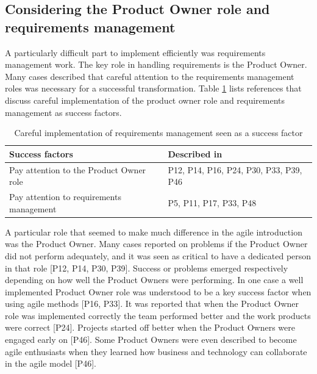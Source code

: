 \subsection{Considering the Product Owner role and requirements management}

A particularly difficult part to implement efficiently was requirements
management work. The key role in handling requirements is the Product Owner.
Many cases described that careful attention to the requirements management roles
was necessary for a successful transformation.
Table \ref{table:success_requirements} lists references that discuss careful
implementation of the product owner role and requirements management as success
factors.

\begin{table}[h]
    \centering
    \begin{tabular}{ >{\raggedright\arraybackslash}p{}
                     >{\raggedright\arraybackslash}p{} }
        \toprule
        Success factors  &  Described in \\
        \midrule
        Pay attention to the Product Owner role  &
                P12, P14, P16, P24, P30, P33, P39, P46  \\
        Pay attention to requirements management  &
                P5, P11, P17, P33, P48  \\
        \bottomrule
    \end{tabular}
    \caption{Careful implementation of requirements management seen as a
             success factor}
    \label{table:success_requirements}
\end{table}


A particular role that seemed to make much difference in the agile introduction
was the Product Owner. Many cases reported on problems if the Product Owner did
not perform adequately, and it was seen as critical to have a dedicated person
in that role [P12, P14, P30, P39].
Success or problems emerged respectively depending on how well the Product
Owners were performing. In one case a well implemented Product Owner role was
understood to be a key success factor when using agile methods [P16, P33].
It was reported that when the Product Owner role was implemented correctly the
team performed better and the work products were correct [P24]. Projects started
off better when the Product Owners were engaged early on [P46]. Some Product
Owners were even described to become agile enthusiasts when they learned how
business and technology can collaborate in the agile model [P46].

